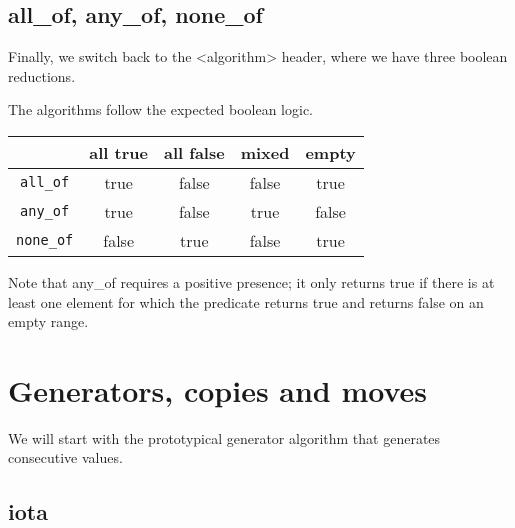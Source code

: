 \subsection{all\_of, any\_of, none\_of}

Finally, we switch back to the <algorithm> header, where we have three boolean reductions.



The algorithms follow the expected boolean logic.

\begin{tabular}{c c c c c}
\hline
& all true & all false & mixed & empty \\
\hline
\texttt{all\_of} & true & false & false & true \\
\hline
\texttt{any\_of} & true & false & true & false \\
\hline
\texttt{none\_of} & false & true & false & true \\
\hline
\end{tabular}

Note that any\_of requires a positive presence; it only returns true if there is at least one element for which the predicate returns true and returns false on an empty range.

\begin{box-note}
\end{box-note}

\section{Generators, copies and moves}

We will start with the prototypical generator algorithm that generates consecutive values.

\subsection{iota}

